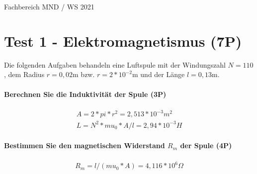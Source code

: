 \documentclass{article}
\begin{document}
Fachbereich MND / WS 2021


\part*{Test 1 - Elektromagnetismus (7P)}

Die folgenden Aufgaben behandeln eine Luftspule mit der Windungszahl $N=110$, dem Radius $r=0{,}02$m bzw. $r=2*10^{ -2 }$m und der Länge $l=0{,}13$m.

\subsection*{Berechnen Sie die Induktivität der Spule (3P)}


\begin{gather}
A=2 * pi * r ^ 2=2{,}513*10^{-3}m^2 \\
L=N ^ 2 * mu_0 * A / l=2{,}94*10^{-3}H
\end{gather}

\subsection*{Bestimmen Sie den magnetischen Widerstand $R_{m}$ der Spule (4P)}


\begin{gather}
R_{m}=l / (mu_0 * A)=4{,}116*10^{6}\Omega
\end{gather}
\end{document}
